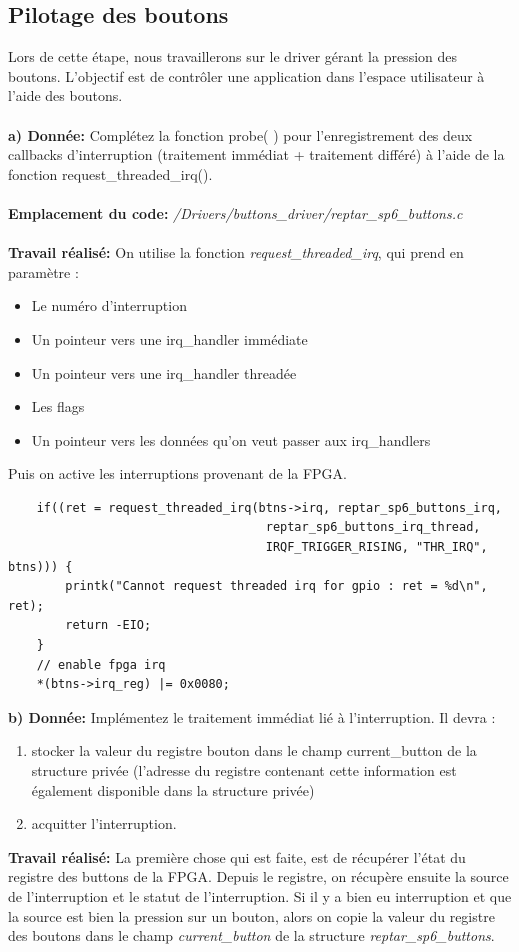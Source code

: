 \subsection{Pilotage des boutons}
Lors de cette étape, nous travaillerons sur le driver gérant la pression des boutons. L'objectif est de
contrôler une application dans l'espace utilisateur à l'aide des boutons.\\\\
\textbf{a) Donnée: }Complétez la fonction probe( ) pour l'enregistrement des deux callbacks d'interruption (traitement
immédiat + traitement différé) à l'aide de la fonction request\_threaded\_irq().\\\\
\textbf{Emplacement du code: }\textit{/Drivers/buttons\_driver/reptar\_sp6\_buttons.c}\\\\ 
\textbf{Travail réalisé: }
On utilise la fonction \textit{request\_threaded\_irq}, qui prend en paramètre :
\begin{itemize}
	\item Le numéro d'interruption
	\item Un pointeur vers une irq\_handler immédiate
	\item Un pointeur vers une irq\_handler threadée
	\item Les flags 
	\item Un pointeur vers les données qu'on veut passer aux irq\_handlers
\end{itemize} 
Puis on active les interruptions provenant de la FPGA.
\begin{lstlisting}
	if((ret = request_threaded_irq(btns->irq, reptar_sp6_buttons_irq, 
									reptar_sp6_buttons_irq_thread, 
									IRQF_TRIGGER_RISING, "THR_IRQ", btns))) {
		printk("Cannot request threaded irq for gpio : ret = %d\n", ret);
		return -EIO;
	}
	// enable fpga irq
	*(btns->irq_reg) |= 0x0080;
\end{lstlisting}

\textbf{b) Donnée: }Implémentez le traitement immédiat lié à l'interruption. Il devra :
\begin{enumerate}
	\item stocker la valeur du registre bouton dans le champ current\_button de la structure privée
	(l'adresse du registre contenant cette information est également disponible dans la structure
	privée)
	\item acquitter l'interruption.\\
\end{enumerate}
\textbf{Travail réalisé: }
La première chose qui est faite, est de récupérer l'état du registre des buttons de la FPGA. Depuis le registre, on récupère ensuite la source de l'interruption et le statut de l'interruption. Si il y a bien eu interruption et que la source est bien la pression sur un bouton, alors on copie la valeur du registre des boutons dans le champ \textit{current\_button} de la structure \textit{reptar\_sp6\_buttons}. 

